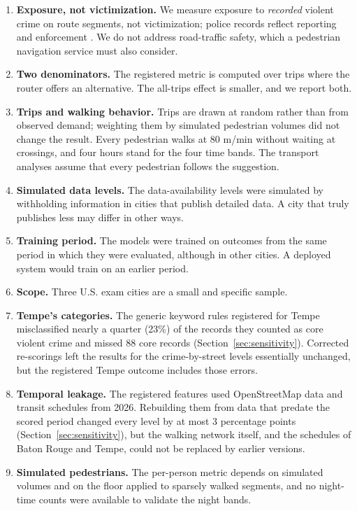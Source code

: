 \documentclass[preprint,12pt,authoryear]{elsarticle}
\begin{document}
\begin{enumerate}
  \item \textbf{Exposure, not victimization.} We measure exposure to \emph{recorded} violent crime on route segments, not victimization; police records reflect reporting and enforcement \citep{lum2016predict}. We do not address road-traffic safety, which a pedestrian navigation service must also consider.
  \item \textbf{Two denominators.} The registered metric is computed over trips where the router offers an alternative. The all-trips effect is smaller, and we report both.
  \item \textbf{Trips and walking behavior.} Trips are drawn at random rather than from observed demand; weighting them by simulated pedestrian volumes did not change the result. Every pedestrian walks at 80 m/min without waiting at crossings, and four hours stand for the four time bands. The transport analyses assume that every pedestrian follows the suggestion.
  \item \textbf{Simulated data levels.} The data-availability levels were simulated by withholding information in cities that publish detailed data. A city that truly publishes less may differ in other ways.
  \item \textbf{Training period.} The models were trained on outcomes from the same period in which they were evaluated, although in other cities. A deployed system would train on an earlier period.
  \item \textbf{Scope.} Three U.S. exam cities are a small and specific sample.
  \item \textbf{Tempe's categories.} The generic keyword rules registered for Tempe misclassified nearly a quarter (23\%) of the records they counted as core violent crime and missed 88 core records (Section~\ref{sec:sensitivity}). Corrected re-scorings left the results for the crime-by-street levels essentially unchanged, but the registered Tempe outcome includes those errors.
  \item \textbf{Temporal leakage.} The registered features used OpenStreetMap data and transit schedules from 2026. Rebuilding them from data that predate the scored period changed every level by at most 3 percentage points (Section~\ref{sec:sensitivity}), but the walking network itself, and the schedules of Baton Rouge and Tempe, could not be replaced by earlier versions.
  \item \textbf{Simulated pedestrians.} The per-person metric depends on simulated volumes and on the floor applied to sparsely walked segments, and no night-time counts were available to validate the night bands.
\end{enumerate}
\end{document}
